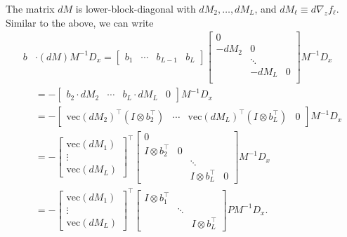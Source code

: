 \documentclass{article}
\begin{document}
The matrix $dM$ is lower-block-diagonal with $dM_2,\ldots, dM_L$, and $dM_\ell \equiv d \nabla_z f_\ell$. Similar to
the above, we can write
\begin{align}
  b & \cdot (dM) M^{-1} D_x =
  \begin{bmatrix}
    b_1 & \cdots & b_{L-1} & b_L
  \end{bmatrix}
  \begin{bmatrix}
    0                  \\
    -dM_2 & 0          \\
          & \ddots     \\
          & -dM_L  & 0 \\
  \end{bmatrix}
  M^{-1} D_x                  \\
    & = -
  \begin{bmatrix}
    b_2 \cdot dM_2 & \cdots & b_L \cdot dM_L & 0
  \end{bmatrix}
  M^{-1} D_x                  \\
    & = -
  \begin{bmatrix}
    \mathrm{vec} \left(dM_2\right)^\top \left(I \otimes b_2^\top\right) &
    \cdots                                                              &
    \mathrm{vec} \left(dM_L\right)^\top \left(I \otimes b_L^\top\right) &
    0
  \end{bmatrix}
  M^{-1} D_x                  \\
    & =
  -
  \begin{bmatrix}
    \mathrm{vec} \left(dM_1\right) \\
    \vdots                         \\
    \mathrm{vec} \left(dM_L\right)
  \end{bmatrix}
  ^\top
  \begin{bmatrix}
    0                                               \\
    I \otimes b_2^\top & 0                          \\
                       &   & \ddots                 \\
                       &   & I \otimes b_L^\top & 0
  \end{bmatrix}
  M^{-1} D_x                  \\
    & = -
  \begin{bmatrix}
    \mathrm{vec} \left(dM_1\right) \\
    \vdots                         \\
    \mathrm{vec} \left(dM_L\right)
  \end{bmatrix}
  ^\top
  \begin{bmatrix}
    I \otimes b_1^\top \\ &\ddots  \\ && I \otimes b_L^\top
  \end{bmatrix}
  PM^{-1} D_x.
\end{align}
\end{document}
